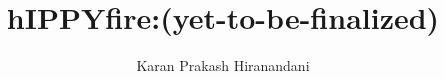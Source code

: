 \documentclass[12pt]{report}
\author{Karan Prakash Hiranandani}                        %
\title{hIPPYfire:(yet-to-be-finalized)}      %
\begin{document}

\copyrightpage

\commcertpage
\titlepage



\begin{acknowledgments} %

\end{acknowledgments}

\utabstract %
\indent



\tableofcontents
\listoffigures






% 

% 



% 

% 






%
\end{document}
